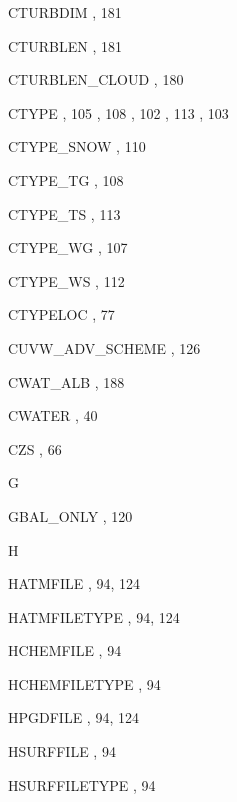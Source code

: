\begin{theindex}
  \item CTURBDIM
    \subitem {},  181
  \item CTURBLEN
    \subitem {},  181
  \item CTURBLEN\_CLOUD
    \subitem {},  180
  \item CTYPE
    \subitem {},  105
    \subitem {},  108
    \subitem {},  102
    \subitem {},  113
    \subitem {},  103
  \item CTYPE\_SNOW
    \subitem {},  110
  \item CTYPE\_TG
    \subitem {},  108
  \item CTYPE\_TS
    \subitem {},  113
  \item CTYPE\_WG
    \subitem {},  107
  \item CTYPE\_WS
    \subitem {},  112
  \item CTYPELOC
    \subitem {},  77
  \item CUVW\_ADV\_SCHEME
    \subitem {},  126
  \item CWAT\_ALB
    \subitem {},  188
  \item CWATER
    \subitem {},  40
  \item CZS
    \subitem {},  66

  \indexspace
G
  \item GBAL\_ONLY
    \subitem {},  120

  \indexspace
H
  \item HATMFILE
    \subitem {},  94, 124
  \item HATMFILETYPE
    \subitem {},  94, 124
  \item HCHEMFILE
    \subitem {},  94
  \item HCHEMFILETYPE
    \subitem {},  94
  \item HPGDFILE
    \subitem {},  94, 124
  \item HSURFFILE
    \subitem {},  94
  \item HSURFFILETYPE
    \subitem {},  94


\end{theindex}
